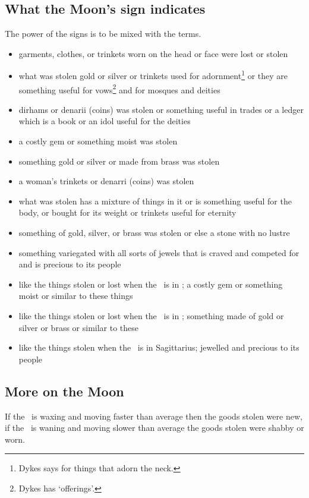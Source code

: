 \subsection{What the Moon's sign indicates}
The power of the signs is to be mixed with the terms. 
\begin{itemize}[topsep=0em,itemsep=0em]
\item[\Aries] garments, clothes, or trinkets worn on the head or face were lost or stolen
\item[\Taurus] what was stolen gold or silver or trinkets used for adornment\footnote{Dykes says for things that adorn the neck.} or they are something useful for vows\footnote{Dykes has `offerings'.} and for mosques and deities
\item[\Gemini] dirhams or denarii (coins) was stolen or something useful in trades or a ledger which is a book or an idol useful for the deities
\item[\Cancer] a costly gem or something moist was stolen
\item[\Leo] something gold or silver or made from brass was stolen
\item[\Virgo] a woman's trinkets or denarri (coins) was stolen
\item[\Libra] what was stolen has a mixture of things in it or is something useful for the body, or bought for its weight or trinkets useful for eternity
\item[\Scorpio] something of gold, silver, or brass was stolen or else a stone with no lustre
\item[\Sagittarius] something variegated with all sorts of jewels that is craved and competed for and is precious to its people
\item[\Capricorn] like the things stolen or lost when the \Moon\, is in \Cancer; a costly gem or something moist or similar to these things
\item[\Aquarius] like the things stolen or lost when the \Moon\, is in \Leo; something made of gold or silver or brass or similar to these
\item[\Pisces] like the things stolen when the \Moon\, is in Sagittarius; jewelled and precious to its people
\end{itemize}

\subsection{More on the Moon}
If the \Moon\, is waxing and moving faster than average then the goods stolen were new, if the \Moon\, is waning and moving slower than average the goods stolen were shabby or worn.

